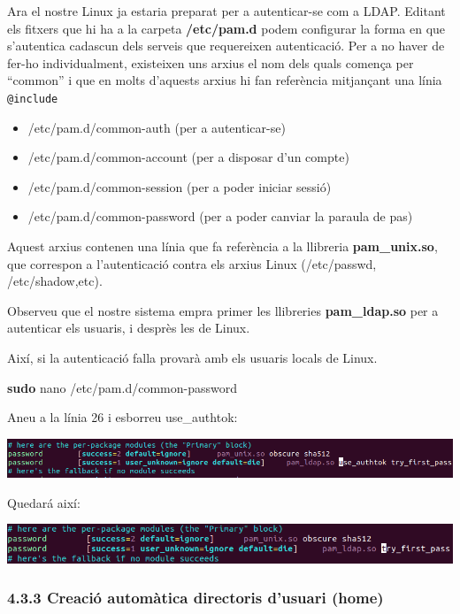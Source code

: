\documentclass[
  12 pt,
  a4paper,
]{article}
\newenvironment{Shaded}{\begin{snugshade}}{\end{snugshade}}
\newcommand{\FunctionTok}[1]{\textcolor[rgb]{0.13,0.29,0.53}{\textbf{#1}}}
\newcommand{\NormalTok}[1]{#1}
\begin{document}
Ara el nostre Linux ja estaria preparat per a autenticar-se com a LDAP.
Editant els fitxers que hi ha a la carpeta \textbf{/etc/pam.d} podem
configurar la forma en que s'autentica cadascun dels serveis que
requereixen autenticació. Per a no haver de fer-ho individualment,
existeixen uns arxius el nom dels quals comença per ``common'' i que en
molts d'aquests arxius hi fan referència mitjançant una línia
\texttt{@include}

\begin{itemize}
\item
  /etc/pam.d/common-auth (per a autenticar-se)
\item
  /etc/pam.d/common-account (per a disposar d'un compte)
\item
  /etc/pam.d/common-session (per a poder iniciar sessió)
\item
  /etc/pam.d/common-password (per a poder canviar la paraula de pas)
\end{itemize}

Aquest arxius contenen una línia que fa referència a la llibreria
\textbf{pam\_unix.so}, que correspon a l'autenticació contra els arxius
Linux (/etc/passwd, /etc/shadow,etc).

Observeu que el nostre sistema empra primer les llibreries
\textbf{pam\_ldap.so} per a autenticar els usuaris, i desprès les de
Linux.

Així, si la autenticació falla provarà amb els usuaris locals de Linux.

\begin{Shaded}
\begin{Highlighting}[]
\FunctionTok{sudo}\NormalTok{ nano /etc/pam.d/common{-}password}
\end{Highlighting}
\end{Shaded}

Aneu a la línia 26 i esborreu use\_authtok:

\includegraphics{png/libpam6.png}

Quedará així:

\includegraphics{png/libpam7.png}

\subsubsection{4.3.3 Creació automàtica directoris d'usuari
(home)}\label{creaciuxf3-automuxe0tica-directoris-dusuari-home}
\end{document}
